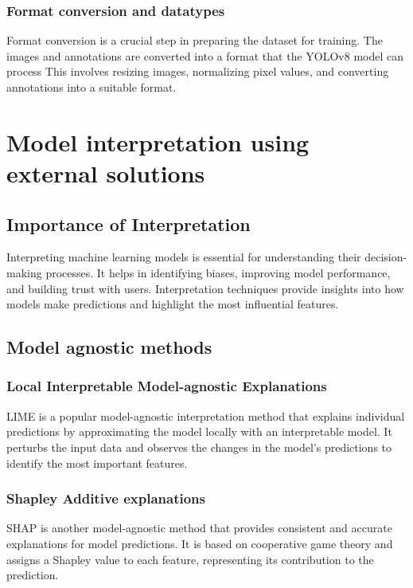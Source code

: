 \documentclass[11pt,a4paper,oneside]{report}
\begin{document}
\subsection{Format conversion and datatypes}\label{subsec:formatconversion}
Format conversion is a crucial step in preparing the dataset for training.
The images and annotations are converted into a format that the YOLOv8 model can process
This involves resizing images, normalizing pixel values, and converting annotations into a suitable format.



\chapter{Model interpretation using external solutions}\label{ch:model-interpretation}

\section{Importance of Interpretation}\label{sec:importance-of-interpretation}
Interpreting machine learning models is essential for understanding their decision-making processes.
It helps in identifying biases, improving model performance, and building trust with users.
Interpretation techniques provide insights into how models make predictions and highlight
the most influential features.
\section{Model agnostic methods}\label{sec:model-agnostic-methods}

\subsection{Local Interpretable Model-agnostic Explanations}\label{subsec:lime}
LIME is a popular model-agnostic interpretation method that explains individual predictions by
approximating the model locally with an interpretable model.
It perturbs the input data and observes the changes in the model's predictions to identify the most
important features.
\subsection{Shapley Additive explanations}\label{subsec:shap}
SHAP is another model-agnostic method that provides consistent and accurate explanations for model predictions.
It is based on cooperative game theory and assigns a Shapley value to each feature,
representing its contribution to the prediction.
\end{document}
